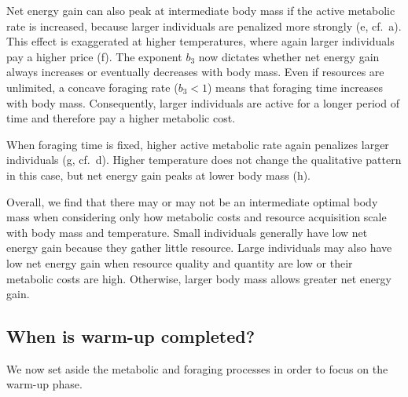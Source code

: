 Net energy gain can also peak at intermediate body mass if the active metabolic rate is increased, because larger individuals are penalized more strongly (e, cf.~a).
This effect is exaggerated at higher temperatures, where again larger individuals pay a higher price (f).
The exponent $b_3$ now dictates whether net energy gain always increases or eventually decreases with body mass.
Even if resources are unlimited, a concave foraging rate ($b_3 < 1$) means that foraging time increases with body mass.
Consequently, larger individuals are active for a longer period of time and therefore pay a higher metabolic cost.

When foraging time is fixed, higher active metabolic rate again penalizes larger individuals (g, cf.~d).
Higher temperature does not change the qualitative pattern in this case, but net energy gain peaks at lower body mass (h).

Overall, we find that there may or may not be an intermediate optimal body mass when considering only how metabolic costs and resource acquisition scale with body mass and temperature.
Small individuals generally have low net energy gain because they gather little resource.
Large individuals may also have low net energy gain when resource quality and quantity are low or their metabolic costs are high.
Otherwise, larger body mass allows greater net energy gain.


\subsection*{When is warm-up completed?}

We now set aside the metabolic and foraging processes in order to focus on the warm-up phase.

